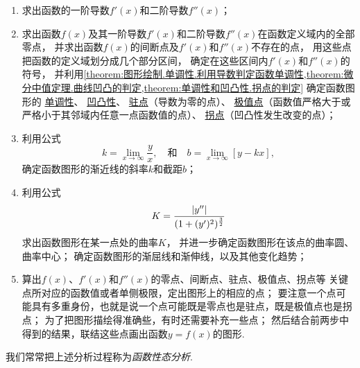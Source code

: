 \begin{enumerate}
	\item 求出函数的一阶导数\(f'(x)\)和二阶导数\(f''(x)\)；

	\item 求出函数\(f(x)\)及其一阶导数\(f'(x)\)和二阶导数\(f''(x)\)在函数定义域内的全部零点，
	并求出函数\(f(x)\)的间断点及\(f'(x)\)和\(f''(x)\)不存在的点，
	用这些点把函数的定义域划分成几个部分区间，
	确定在这些区间内\(f'(x)\)和\(f''(x)\)的符号，
	并利用\cref{theorem:图形绘制.单调性.利用导数判定函数单调性,theorem:微分中值定理.曲线凹凸的判定,theorem:单调性和凹凸性.拐点的判定}
	确定函数图形的%
	\hyperref[definition:函数的性质.单调性]{单调性}、%
	\hyperref[definition:函数图像的绘制.凹凸性的定义]{凹凸性}、%
	\hyperref[definition:函数的极值与最值.驻点]{驻点}（导数为零的点）、%
	\hyperref[definition:函数的极值与最值.极值点]{极值点}（函数值严格大于或严格小于其邻域内任意一点函数值的点）、%
	\hyperref[definition:单调性和凹凸性.拐点]{拐点}（凹凸性发生改变的点）；

	\item 利用公式\begin{equation*}
		k = \lim_{x\to\infty} \frac{y}{x},
		\quad\text{和}\quad
		b = \lim_{x\to\infty} \left[y - kx\right],
	\end{equation*}确定函数图形的渐近线的斜率\(k\)和截距\(b\)；

	\item 利用公式\begin{equation*}
		K = \frac{\abs{y''}}{(1+(y')^2)^{\frac32}}
	\end{equation*}求出函数图形在某一点处的曲率\(K\)，
	并进一步确定函数图形在该点的曲率圆、曲率中心；
	确定函数图形的渐屈线和渐伸线，以及其他变化趋势；

	\item 算出\(f(x)\)、\(f'(x)\)和\(f''(x)\)的零点、间断点、驻点、极值点、拐点等
	关键点所对应的函数值或者单侧极限，定出图形上的相应的点；
	要注意一个点可能具有多重身份，也就是说一个点可能既是零点也是驻点，既是极值点也是拐点；
	为了把图形描绘得准确些，有时还需要补充一些点；
	然后结合前两步中得到的结果，联结这些点画出函数\(y=f(x)\)的图形.
\end{enumerate}
我们常常把上述分析过程称为\emph{函数性态分析}.
